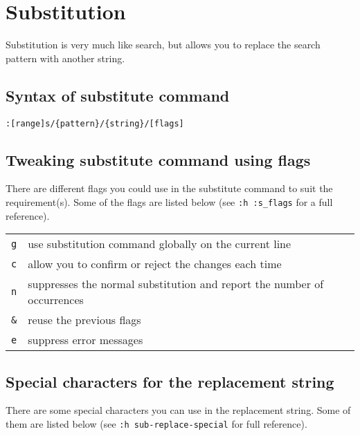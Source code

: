 \chapter{Substitution}

Substitution is very much like search, but allows you to replace the search pattern with another string.

\section{Syntax of substitute command}

\begin{center}
    \LARGE{\verb|:[range]s/{pattern}/{string}/[flags]|}
\end{center}

\section{Tweaking substitute command using flags}

There are different flags you could use in the substitute command to suit the requirement(s).
Some of the flags are listed below (see \verb|:h :s_flags| for a full reference).
\newline

\begin{tabular}{c|l}
\verb|g| & use substitution command globally on the current line\\
\verb|c| & allow you to confirm or reject the changes each time\\
\verb|n| & suppresses the normal substitution and report the number of occurrences\\
\verb|&| & reuse the previous flags\\
\verb|e| & suppress error messages\\
\end{tabular}

\section{Special characters for the replacement string}

There are some special characters you can use in the replacement string.
Some of them are listed below (see \verb|:h sub-replace-special| for full reference).
\newline

